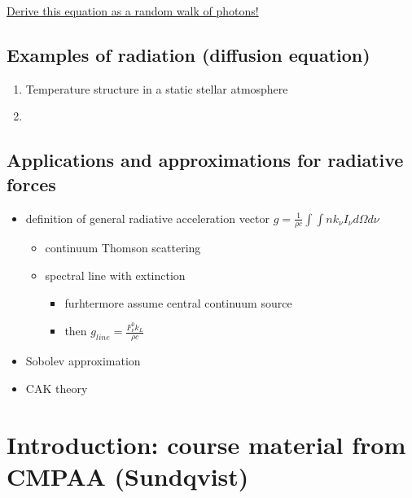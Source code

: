 \documentclass[../main/main.tex]{subfiles}
\begin{document}
\underline{Derive this equation as a random walk of photons!}

\subsection{Examples of radiation (diffusion equation)}
\begin{enumerate}
\item Temperature structure in a static stellar atmosphere
\item 
\end{enumerate}

\subsection{Applications and approximations for radiative forces}
\begin{itemize}
\item definition of general radiative acceleration vector $g = \frac{1}{\rho c}\int \int n k_{\nu} I_{\nu} d\Omega d\nu$
\begin{itemize}
\item continuum Thomson scattering
\item spectral line with extinction
\begin{itemize}
\item furhtermore assume central continuum source
\item then $g_{line} = \frac{F_{\nu}^0 k_L}{\rho c}$
\end{itemize}
\end{itemize}

\item Sobolev approximation
\item CAK theory
\end{itemize}

\newpage
\section{Introduction: course material from CMPAA (Sundqvist)}
\end{document}
